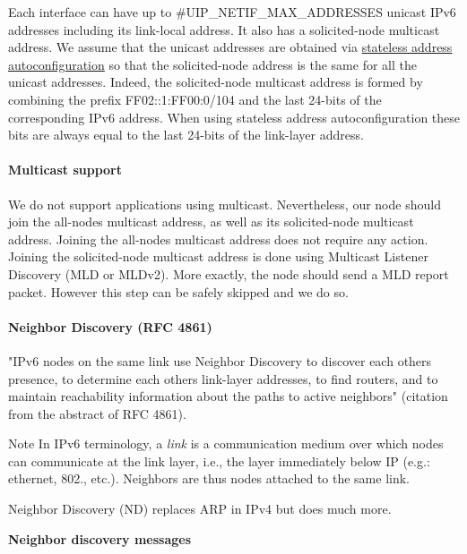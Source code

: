 Each interface can have up to \#\+U\+I\+P\+\_\+\+N\+E\+T\+I\+F\+\_\+\+M\+A\+X\+\_\+\+A\+D\+D\+R\+E\+S\+S\+ES unicast I\+Pv6 addresses including its link-\/local address. It also has a solicited-\/node multicast address. We assume that the unicast addresses are obtained via \hyperlink{a00075_autoconf}{stateless address autoconfiguration} so that the solicited-\/node address is the same for all the unicast addresses. Indeed, the solicited-\/node multicast address is formed by combining the prefix F\+F02\+:\+:1\+:F\+F00\+:0/104 and the last 24-\/bits of the corresponding I\+Pv6 address. When using stateless address autoconfiguration these bits are always equal to the last 24-\/bits of the link-\/layer address.\hypertarget{a00075_multicast}{}\paragraph{Multicast support}\label{a00075_multicast}
We do not support applications using multicast. Nevertheless, our node should join the all-\/nodes multicast address, as well as its solicited-\/node multicast address. Joining the all-\/nodes multicast address does not require any action. Joining the solicited-\/node multicast address is done using Multicast Listener Discovery (M\+LD or M\+L\+Dv2). More exactly, the node should send a M\+LD report packet. However this step can be safely skipped and we do so.\hypertarget{a00075_nd}{}\paragraph{Neighbor Discovery (\+R\+F\+C 4861)}\label{a00075_nd}
"I\+Pv6 nodes on the same link use Neighbor Discovery to discover each other\textquotesingle{}s presence, to determine each other\textquotesingle{}s link-\/layer addresses, to find routers, and to maintain reachability information about the paths to active neighbors" (citation from the abstract of R\+FC 4861).

\begin{DoxyNote}{Note}
In I\+Pv6 terminology, a {\itshape link} is a communication medium over which nodes can communicate at the link layer, i.\+e., the layer immediately below IP (e.\+g.\+: ethernet, 802., etc.). Neighbors are thus nodes attached to the same link.
\end{DoxyNote}
Neighbor Discovery (ND) replaces A\+RP in I\+Pv4 but does much more.

{\bfseries Neighbor discovery messages }~\newline


